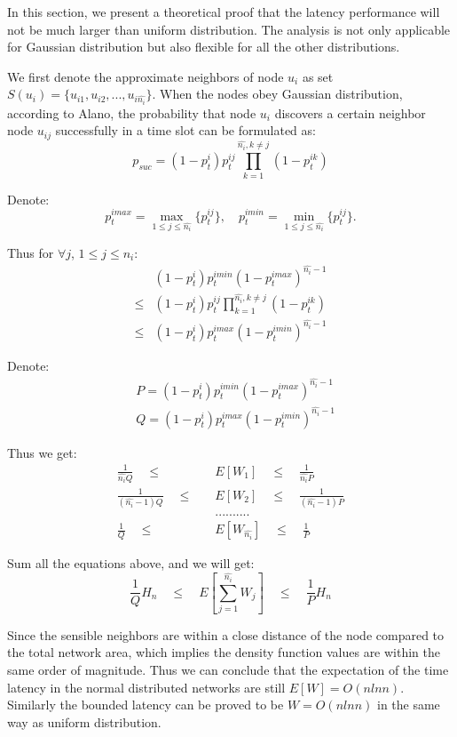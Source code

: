 In this section, we present a theoretical proof that the latency performance
will not be much larger than uniform distribution.
The analysis is not only applicable for Gaussian distribution
but also flexible for all the other distributions.

We first denote the approximate neighbors of node $u_i$
as set $S(u_i) = \{u_{i1},u_{i2},...,u_{i\hat{n_i}}\}$.
When the nodes obey Gaussian distribution, according to Alano, 
the probability that node $u_i$ discovers a certain 
neighbor node $u_{ij}$ successfully in a time slot can be formulated as:
$$
p_{suc} = (1-p_t^i)p_t^{ij}\prod_{ k=1}^{\hat{n_i}, k\neq j}(1-p_t^{ik})
$$

Denote:
$$
p_t^{imax} = \max_{1 \leq j \leq \hat{n_i}}\{p_t^{ij}\}, \quad p_t^{imin} = \min_{1 \leq j \leq \hat{n_i}}\{p_t^{ij}\}.
$$

Thus for $\forall j$, $1 \leq j \leq n_i$:
\begin{align*}
&(1-p_t^i)p_t^{imin}{(1-p_t^{imax})}^{\hat{n_i}-1} \\
\leq &(1-p_t^i)p_t^{ij}\prod_{ k=1}^{\hat{n_i}, k\neq j}(1-p_t^{ik}) \\
\leq &(1-p_t^i)p_t^{imax}{(1-p_t^{imin})}^{\hat{n_i}-1} 
\end{align*}

Denote:
\begin{align*}
&P = (1-p_t^i)p_t^{imin}{(1-p_t^{imax})}^{\hat{n_i}-1}  \\
&Q = (1-p_t^i)p_t^{imax}{(1-p_t^{imin})}^{\hat{n_i}-1} 
\end{align*}

Thus we get:
\begin{align*}
\frac{1}{\hat{n_i}Q} \quad \leq \quad &E[W_1] \quad \leq \quad \frac{1}{\hat{n_i}P} \\
\frac{1}{(\hat{n_i}-1)Q} \quad \leq \quad &E[W_2] \quad \leq \quad \frac{1}{(\hat{n_i}-1)P} \\
& ..........\\
\frac{1}{Q} \quad \leq \quad &E[W_{\hat{n_i}}] \quad \leq \quad \frac{1}{P} 
\end{align*}

Sum all the equations above, and we will get:
$$
\frac{1}{Q}H_n  \quad \leq \quad E[\sum_{j=1}^{\hat{n_i}}W_j]  \quad \leq \quad \frac{1}{P}H_n
$$

Since the sensible neighbors are within a close distance of the node 
compared to the total network area, 
which implies the density function values are within the same order of magnitude.
Thus we can conclude that the expectation of the time latency in the normal 
distributed networks are still $E[W]=O(nlnn)$.
Similarly the bounded latency can be proved to be $W=O(nlnn)$ in the same way as
uniform distribution.


